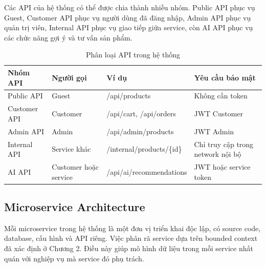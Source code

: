 \documentclass[../main.tex]{subfiles}
\begin{document}
Các API của hệ thống có thể được chia thành nhiều nhóm. Public API phục vụ Guest, Customer API phục vụ người dùng đã đăng nhập, Admin API phục vụ quản trị viên, Internal API phục vụ giao tiếp giữa service, còn AI API phục vụ các chức năng gợi ý và tư vấn sản phẩm.

\begin{table}[H]
    \centering
    \caption{Phân loại API trong hệ thống}
    \label{tab:chapter4-api-types}
    \begin{tabular}{|p{}|p{}|p{}|p{}|}
        \hline
        \rowcolor{primary!35}
        \textbf{Nhóm API} & \textbf{Người gọi} & \textbf{Ví dụ} & \textbf{Yêu cầu bảo mật} \\
        \hline
        Public API & Guest & /api/products & Không cần token \\
        \hline
        Customer API & Customer & /api/cart, /api/orders & JWT Customer \\
        \hline
        Admin API & Admin & /api/admin/products & JWT Admin \\
        \hline
        Internal API & Service khác & /internal/products/\{id\} & Chỉ truy cập trong network nội bộ \\
        \hline
        AI API & Customer hoặc service & /api/ai/recommendations & JWT hoặc service token \\
        \hline
    \end{tabular}
\end{table}

\subsection{Microservice Architecture}
\label{subsection:4.2.2}

Mỗi microservice trong hệ thống là một đơn vị triển khai độc lập, có source code, database, cấu hình và API riêng. Việc phân rã service dựa trên bounded context đã xác định ở Chương 2. Điều này giúp mô hình dữ liệu trong mỗi service nhất quán với nghiệp vụ mà service đó phụ trách.
\end{document}
